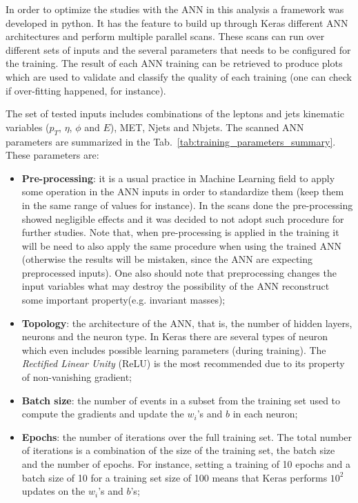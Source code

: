 In order to optimize the studies with the ANN in this analysis a framework was developed in python. It has the feature to build up through Keras different ANN architectures and perform multiple parallel scans. These scans can run over different sets of inputs and the several parameters that needs to be configured for the training. The result of each ANN training can be retrieved to produce plots which are used to validate and classify the quality of each training (one can check if over-fitting happened, for instance). 

The set of tested inputs includes combinations of the leptons and jets kinematic variables ($p_{T}$, $\eta$, $\phi$ and $E$), MET, Njets and Nbjets. The scanned ANN parameters are summarized in the Tab.~\ref{tab:training_parameters_summary}. These parameters are:
\begin{itemize}
	\item \textbf{Pre-processing}: it is a usual practice in Machine Learning field to apply some operation in the ANN inputs in order to standardize them (keep them in the same range of values for instance). In the scans done the pre-processing showed negligible effects and it was decided to not adopt such procedure for further studies. Note that, when pre-processing is applied in the training it will be need to also apply the same procedure when using the trained ANN (otherwise the results will be mistaken, since the ANN are expecting preprocessed inputs). One also should note that preprocessing changes the input variables what may destroy the possibility of the ANN reconstruct some important property(e.g. invariant masses);
	\item \textbf{Topology}: the architecture of the ANN, that is, the number of hidden layers, neurons and the neuron type. In Keras there are several types of neuron which even includes possible learning parameters (during training). The \textit{Rectified Linear Unity} (ReLU) is the most recommended due to its property of non-vanishing gradient;
	\item \textbf{Batch size}: the number of events in a subset from the training set used to compute the gradients and update the \textbf{$w_{i}$}'s and \textbf{$b$} in each neuron;
	\item \textbf{Epochs}: the number of iterations over the full training set. The total number of iterations is a combination of the size of the training set, the batch size and the number of epochs. For instance, setting a training of 10 epochs and a batch size of 10 for a training set size of 100 means that Keras performs $10^{2}$ updates on the \textbf{$w_{i}$}'s and \textbf{$b$}'s;

\end{itemize}
